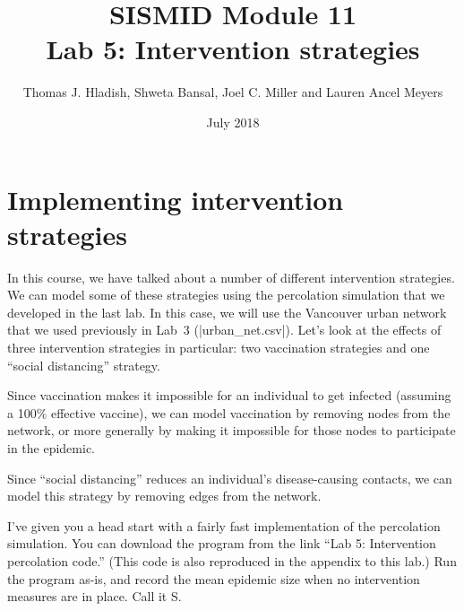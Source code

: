 \documentclass{article}
\begin{document}
\title{SISMID Module 11\\Lab 5: Intervention strategies}
\author{Thomas J. Hladish, Shweta Bansal, Joel C. Miller and Lauren Ancel Meyers}
\date{July 2018}
\maketitle


\section*{Implementing intervention strategies}

In this course, we have talked about a number of different intervention strategies. We can model some of these 
strategies using the percolation simulation that we developed in the last lab.  In this case, we will use
the Vancouver urban network that we used previously in Lab~3 (|urban_net.csv|).  Let's look at the effects of
three intervention strategies in particular: two vaccination strategies and one ``social distancing'' strategy.

Since vaccination makes it impossible for an individual to get infected (assuming a 100\% effective vaccine), we can
model vaccination by removing nodes from the network, or more generally by making it impossible for those nodes to participate in the epidemic.

Since ``social distancing'' reduces an individual's disease-causing contacts, we can model this strategy by
removing edges from the network.

I've given you a head start with a fairly fast implementation of the percolation simulation.  You can download the program 
from the link ``Lab 5: Intervention percolation code.''  (This code is also reproduced in the appendix to this lab.)  Run the program as-is,
and record the mean epidemic size when no intervention measures are in place.  Call it S.
\end{document}
